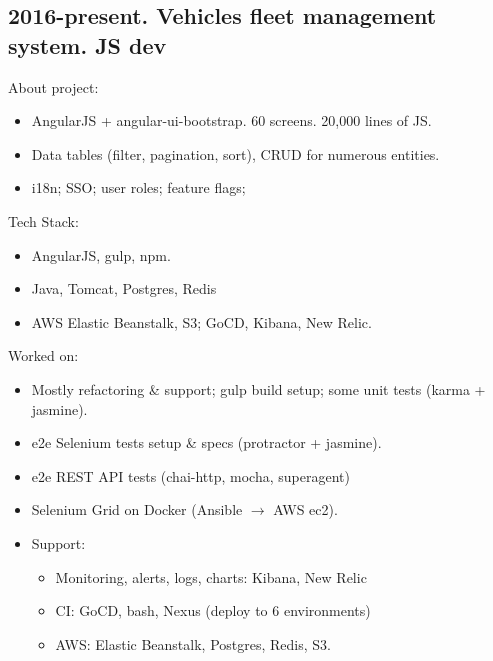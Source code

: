 \documentclass[a4paper, 14pt]{article}
\begin{document}
	\subsection{2016-present. Vehicles fleet management system. JS dev}
    About project:
    \begin{itemize}
      \item AngularJS + angular-ui-bootstrap. 60 screens. 20,000 lines of JS. \\
      \item Data tables (filter, pagination, sort), CRUD for numerous entities. \\
      \item i18n; SSO; user roles; feature flags; \\
    \end{itemize}
    Tech Stack:
    \begin{itemize}
      \item AngularJS, gulp, npm. \\
      \item Java, Tomcat, Postgres, Redis \\
      \item AWS Elastic Beanstalk, S3; GoCD, Kibana, New Relic. \\
    \end{itemize}
    Worked on: 
    \begin{itemize}
      \item Mostly refactoring \& support; gulp build setup; some unit tests (karma + jasmine). \\
      \item e2e Selenium tests setup \& specs (protractor + jasmine). \\
      \item e2e REST API tests (chai-http, mocha, superagent) \\
      \item Selenium Grid on Docker (Ansible $\rightarrow$ AWS ec2). \\
      \item Support:
        \begin{itemize}
          \item Monitoring, alerts, logs, charts: Kibana, New Relic \\
          \item CI: GoCD, bash, Nexus (deploy to 6 environments) \\
          \item AWS: Elastic Beanstalk, Postgres, Redis, S3. \\
        \end{itemize}
      \end{itemize}
      
\end{document}
